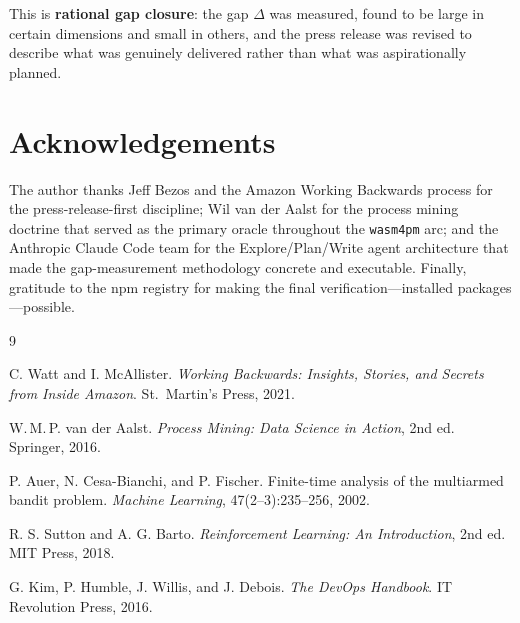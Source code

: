 \documentclass[11pt,a4paper]{article}
\newcommand{\code}[1]{\texttt{#1}}
\begin{document}
This is \textbf{rational gap closure}: the gap $\Delta$ was measured, found to be large in certain dimensions and small in others, and the press release was revised to describe what was genuinely delivered rather than what was aspirationally planned.

\section*{Acknowledgements}

The author thanks Jeff Bezos and the Amazon Working Backwards process for the
press-release-first discipline; Wil van der Aalst for the process mining
doctrine that served as the primary oracle throughout the \code{wasm4pm} arc; and
the Anthropic Claude Code team for the Explore/Plan/Write agent architecture
that made the gap-measurement methodology concrete and executable. Finally, gratitude to the npm registry for making the final verification—installed packages—possible.

\begin{thebibliography}{9}

C. Watt and I. McAllister.
\textit{Working Backwards: Insights, Stories, and Secrets from Inside Amazon}.
St.\ Martin's Press, 2021.

W.\,M.\,P. van der Aalst.
\textit{Process Mining: Data Science in Action}, 2nd ed.
Springer, 2016.

P. Auer, N. Cesa-Bianchi, and P. Fischer.
Finite-time analysis of the multiarmed bandit problem.
\textit{Machine Learning}, 47(2--3):235--256, 2002.

R. S. Sutton and A. G. Barto.
\textit{Reinforcement Learning: An Introduction}, 2nd ed.
MIT Press, 2018.

G. Kim, P. Humble, J. Willis, and J. Debois.
\textit{The DevOps Handbook}.
IT Revolution Press, 2016.

\end{thebibliography}
\end{document}
